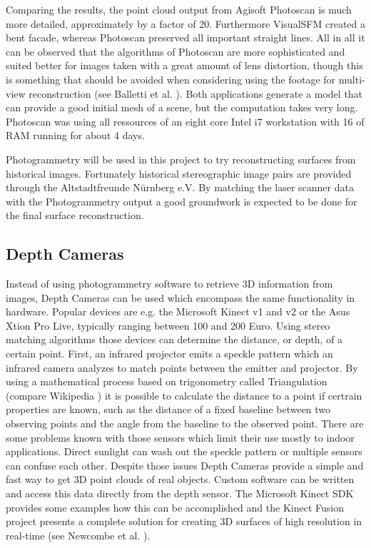 Comparing the results, the point cloud output from Agisoft Photoscan is much more detailed, approximately by a factor of 20. Furthermore VisualSFM created a bent facade, whereas Photoscan preserved all important straight lines. All in all it can be observed that the algorithms of Photoscan are more sophisticated and suited better for images taken with a great amount of lens distortion, though this is something that should be avoided when considering using the footage for multi-view reconstruction (see Balletti et al. \parencite{calibration_of_action_cameras}). Both applications generate a model that can provide a good initial mesh of a scene, but the computation takes very long. Photoscan was using all ressources of an eight core Intel i7 workstation with 16 of RAM running for about 4 days.

Photogrammetry will be used in this project to try reconstructing surfaces from historical images. Fortunately historical stereographic image pairs are provided through the Altstadtfreunde Nürnberg e.V. By matching the laser scanner data with the Photogrammetry output a good groundwork is expected to be done for the final surface reconstruction.

\subsection{Depth Cameras}

Instead of using photogrammetry software to retrieve 3D information from images, Depth Cameras can be used which encompass the same functionality in hardware. Popular devices are e.g. the Microsoft Kinect v1 and v2 or the Asus Xtion Pro Live, typically ranging between 100 and 200 Euro. Using stereo matching algorithms those devices can determine the distance, or depth, of a certain point. First, an infrared projector emits a speckle pattern which an infrared camera analyzes to match points between the emitter and projector. By using a mathematical process based on trigonometry called Triangulation (compare Wikipedia \parencite{wiki:Triangulation}) it is possible to calculate the distance to a point if certrain properties are known, such as the distance of a fixed baseline between two observing points and the angle from the baseline to the observed point. There are some problems known with those sensors which limit their use mostly to indoor applications. Direct sunlight can wash out the speckle pattern or multiple sensors can confuse each other. Despite those issues Depth Cameras provide a simple and fast way to get 3D point clouds of real objects. Custom software can be written and access this data directly from the depth sensor. The Microsoft Kinect SDK provides some examples how this can be accomplished and the Kinect Fusion project presents a complete solution for creating 3D surfaces of high resolution in real-time (see Newcombe et al. \parencite{kinectfusion}).

